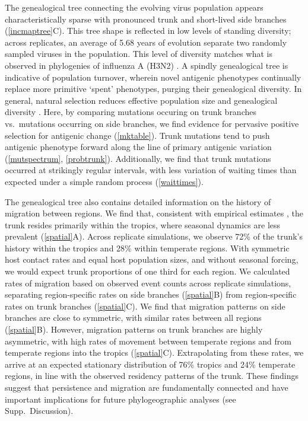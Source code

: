 The genealogical tree connecting the evolving virus population appears characteristically sparse with pronounced trunk and short-lived side branches  (\ref{incmaptree}C).  This tree shape is reflected in low levels of standing diversity; across replicates, an average of 5.68 years of evolution separate two randomly sampled viruses in the population.  This level of diversity matches what is observed in phylogenies of influenza A (H3N2) \cite{Rambaut08}.  A spindly genealogical tree is indicative of population turnover, wherein novel antigenic phenotypes continually replace more primitive `spent' phenotypes, purging their genealogical diversity.  In general, natural selection reduces effective population size and genealogical diversity \cite{BedfordBMC11}.  Here, by comparing mutations occuring on trunk branches vs.\ mutations occurring on side branches, we find evidence for pervasive positive selection for antigenic change (\ref{mktable}).  Trunk mutations tend to push antigenic phenotype forward along the line of primary antigenic variation (\ref{mutspectrum}, \ref{probtrunk}).  Additionally, we find that trunk mutations occurred at strikingly regular intervals, with less variation of waiting times than expected under a simple random process (\ref{waittimes}).

The genealogical tree also contains detailed information on the history of migration between regions.  We find that, consistent with empirical estimates \cite{Russell08,Bedford10}, the trunk resides primarily within the tropics, where seasonal dynamics are less prevalent (\ref{spatial}A).  Across replicate simulations, we observe 72\% of the trunk's history within the tropics and 28\% within temperate regions.  With symmetric host contact rates and equal host population sizes, and without seasonal forcing, we would expect trunk proportions of one third for each region.  We calculated rates of migration based on observed event counts across replicate simulations, separating region-specific rates on side branches (\ref{spatial}B) from region-specific rates on trunk branches (\ref{spatial}C).  We find that migration patterns on side branches are close to symmetric, with similar rates between all regions (\ref{spatial}B).  However, migration patterns on trunk branches are highly asymmetric, with high rates of movement between temperate regions and from temperate regions into the tropics (\ref{spatial}C).  Extrapolating from these rates, we arrive at an expected stationary distribution of 76\% tropics and 24\% temperate regions, in line with the observed residency patterns of the trunk.  These findings suggest that persistence and migration are fundamentally connected and have important implications for future phylogeographic analyses (see Supp.\ Discussion).

